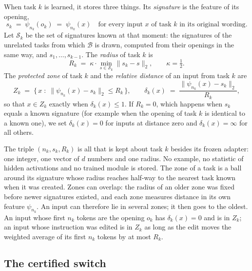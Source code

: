 \begin{definition}
When task $k$ is learned, it stores three things. Its \emph{signature} is the feature of its opening,
\begin{equation}
  s_k \;=\; \psi_{n_k}(o_k) \;=\; \psi_{n_k}(x) \quad \text{for every input } x \text{ of task } k \text{ in its original wording}.
  \label{eq:signature}
\end{equation}
Let $\mathcal{S}_k$ be the set of signatures known at that moment: the signatures of the unrelated
tasks from which $\mathcal{B}$ is drawn, computed from their openings in the same way, and
$s_1, \dots, s_{k-1}$. The \emph{radius} of task $k$ is
\begin{equation}
  R_k \;=\; \kappa \cdot \min_{s \in \mathcal{S}_k} \lVert s_k - s \rVert_2 , \qquad \kappa = \tfrac{1}{2} .
  \label{eq:radius}
\end{equation}
The \emph{protected zone} of task $k$ and the \emph{relative distance} of an input from task $k$ are
\begin{equation}
  Z_k \;=\; \{\, x \;:\; \lVert \psi_{n_k}(x) - s_k \rVert_2 \le R_k \,\} ,
  \qquad
  \delta_k(x) \;=\; \frac{\lVert \psi_{n_k}(x) - s_k \rVert_2}{R_k} ,
  \label{eq:zone}
\end{equation}
so that $x \in Z_k$ exactly when $\delta_k(x) \le 1$. If $R_k = 0$, which happens when $s_k$ equals a known signature (for example when the opening
of task $k$ is identical to a known one), we set $\delta_k(x) = 0$ for inputs at distance zero and
$\delta_k(x) = \infty$ for all others.
\end{definition}

The triple $(n_k, s_k, R_k)$ is all that is kept about task $k$ besides its frozen adapter: one
integer, one vector of $d$ numbers and one radius. No example, no statistic of hidden activations
and no trained module is stored. The zone of a task is a ball around its signature whose radius
reaches half-way to the nearest task known when it was created. Zones can overlap: the radius of an older zone
was fixed before newer signatures existed, and each zone measures distance in its own feature $\psi_{n_k}$. An input can
therefore lie in several zones; it then goes to the oldest. An input whose first $n_k$ tokens
are the opening $o_k$ has $\delta_k(x) = 0$ and is in $Z_k$; an input whose instruction was edited
is in $Z_k$ as long as the edit moves the weighted average of its first $n_k$ tokens by at most
$R_k$.

\subsection{The certified switch}
\label{sec:switch}

